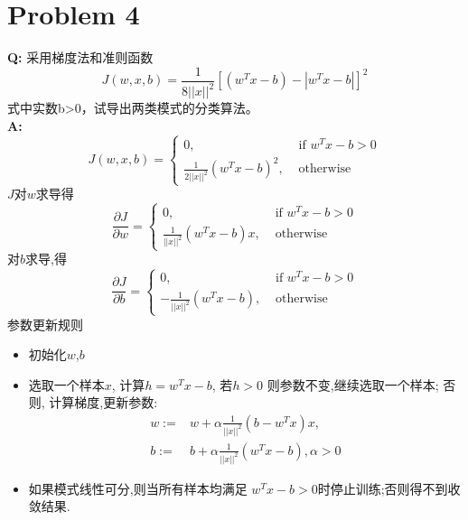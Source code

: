 \documentclass[12pt,a4paper]{article}
\begin{document}
\section{Problem 4}
 \textbf{Q: }
采用梯度法和准则函数 
\[
	J(w,x,b) = \frac{1}{8||x||^2} [(w^Tx - b) - |w^Tx-b|]^2
\]
式中实数b>0，试导出两类模式的分类算法。 \\
 \textbf{A: }
\[
   J(w,x,b) =  \left\lbrace
     \begin{split}
        0, &\text{ if } w^Tx - b > 0 \\
         \frac{1}{2||x||^2}(w^Tx - b)^2, &\text{ otherwise}
     \end{split}
   \right. 
\]
 $J$对$w$求导得
 \[
   \frac{\partial J}{\partial w} = \left\lbrace 
     \begin{split}
	     0, &\text{ if } w^Tx - b > 0 \\ 
	     \frac{1}{||x||^2}(w^Tx - b)x, &\text{ otherwise}
     \end{split}
    \right.  
 \]
 对$b$求导,得
 \[
    \frac{\partial J}{\partial b} = \left\lbrace 
    \begin{split}
    0, &\text{ if } w^Tx - b > 0 \\ 
    -\frac{1}{||x||^2}(w^Tx - b), &\text{ otherwise}
    \end{split}
    \right.  
 \]
 参数更新规则
 \begin{itemize}
 	\item 初始化$w$,$b$
 	\item 选取一个样本$x$, 计算$h = w^Tx-b$, 若$h > 0$ 则参数不变,继续选取一个样本;
 	否则, 计算梯度,更新参数:
 	  \[ \begin{split} 
    	    w := &w + \alpha \frac{1}{||x||^2}(b-w^Tx)x, \\
    	    b := &b + \alpha\frac{1}{||x||^2}(w^Tx - b) ,\alpha > 0
    	 \end{split} 
 	  \]
 	\item 如果模式线性可分,则当所有样本均满足 $w^Tx - b > 0$时停止训练;否则得不到收敛结果.
 \end{itemize}
 
\end{document}

